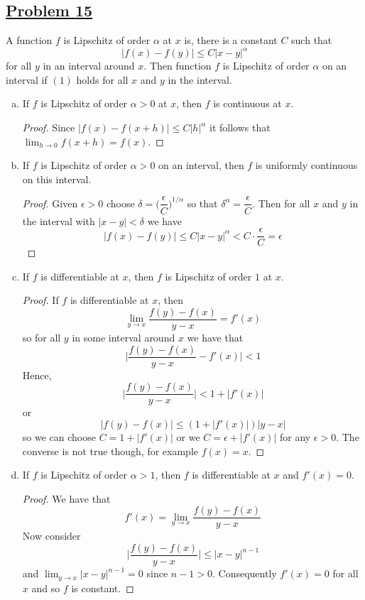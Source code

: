\documentclass[10pt,letterpaper]{article}
\begin{document}
	\subsection*{{\color{purple}\underline{Problem 15}}}
	A function $f$ is Lipschitz of order $\alpha$ at $x$ is, there is a constant $C$ such that
	\[
		|f(x) - f(y)| \leq C|x - y|^{\alpha}
	\]		
	for all $y$ in an interval around $x$. Then function $f$ is Lipschitz of order $\alpha$
	on an interval if $(1)$ holds for all $x$ and $y$ in the interval.
	\begin{enumerate}[(a)]
		\item If $f$ is Lipschitz of order $\alpha > 0$ at $x$, then $f$ is continuous at $x$.
\begin{proof}
	Since $|f(x) - f(x + h)| \leq C|h|^{\alpha}$ it follows that $\displaystyle\lim_{h\to 0}
	f(x+h) = f(x)$.
\end{proof}
		\item If $f$ is Lipschitz of order $\alpha > 0$ on an interval, then $f$ is uniformly
		continuous on this interval.
\begin{proof}
Given $\epsilon > 0$ choose $\delta = \bigg(\dfrac{\epsilon}{C}\bigg)^{1/\alpha}$ so that
$\delta^{\alpha} = \dfrac{\epsilon}{C}$. Then for all $x$ and $y$ in the interval 
with $|x - y| < \delta$ we have
	$$|f(x) - f(y)| \leq C|x - y|^{\alpha} < C \cdot \dfrac{\epsilon}{C} = \epsilon$$
\end{proof}
	\item If $f$ is differentiable at $x$, then $f$ is Lipschitz of order $1$ at $x$.
	\begin{proof}
	If $f$ is differentiable at $x$, then 
	$$\displaystyle\lim_{y\to x} \dfrac{f(y) - f(x)}{y - x} = f'(x)$$
	so for all $y$ in some interval around $x$ we have that
	$$\bigg| \dfrac{f(y) - f(x)}{y - x} - f'(x) \bigg| < 1$$ 	
	Hence,
	$$\bigg| \dfrac{f(y) - f(x)}{y - x} \bigg| < 1 + |f'(x)|$$	
	or 
	$$|f(y) - f(x)| \leq (1 + |f'(x)|)|y - x|$$
	so we can choose $C = 1 + |f'(x)|$ or we $C = \epsilon + |f'(x)|$ for 
	any $\epsilon > 0$. The converse is not true though, for example $f(x) = x$.	
	\end{proof}		
	
	
	\item If $f$ is Lipschitz of order $\alpha > 1$, then $f$ is differentiable at $x$ and
		$f'(x) = 0$.
	\begin{proof}
	 We have that 
	 $$f'(x) = \displaystyle\lim_{y\to x}\dfrac{f(y) - f(x)}{y - x}$$
	 Now consider 
	 $$\bigg|\dfrac{f(y) - f(x)}{y - x}\bigg| \leq |x - y|^{n-1}$$
	 and $\lim_{y\to x} |x - y|^{n-1} = 0$ since $n - 1 > 0$. Consequently
	 $f'(x) = 0$ for all $x$ and so $f$ is constant.
	 	
	\end{proof}
	
	\end{enumerate}
		
\end{document}
